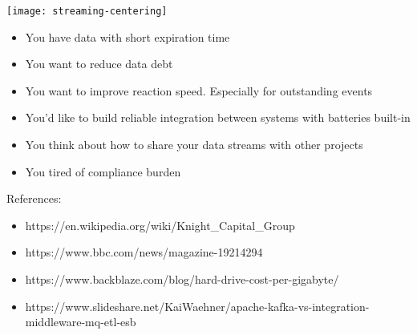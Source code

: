 \documentclass[aspectratio=169, 15pt,usenames,dvipsnames]{beamer}
\begin{document}
\begin{gdsw}
	\centering\texttt{[image: streaming-centering]}         
	\begin{center} 
		\begin{itemize}
			\item You have data with short expiration time
			      \pause
			\item You want to reduce data debt
			      \pause
			\item You want to improve reaction speed. Especially for outstanding events
			      \pause
			\item You'd like to build reliable integration between systems with batteries built-in
			      \pause
			\item You think about how to share your data streams with other projects
			      \pause
			\item You tired of compliance burden
		\end{itemize}
	\end{center}
\end{gdsw}
\begin{gdsw}
	\par
	References:
	\begin{center}\tiny
		\begin{itemize}
			\item https://en.wikipedia.org/wiki/Knight\_Capital\_Group
			\item https://www.bbc.com/news/magazine-19214294
			\item https://www.backblaze.com/blog/hard-drive-cost-per-gigabyte/
			\item https://www.slideshare.net/KaiWaehner/apache-kafka-vs-integration-middleware-mq-etl-esb
		\end{itemize}
	\end{center}
\end{gdsw}
    	
\end{document}
